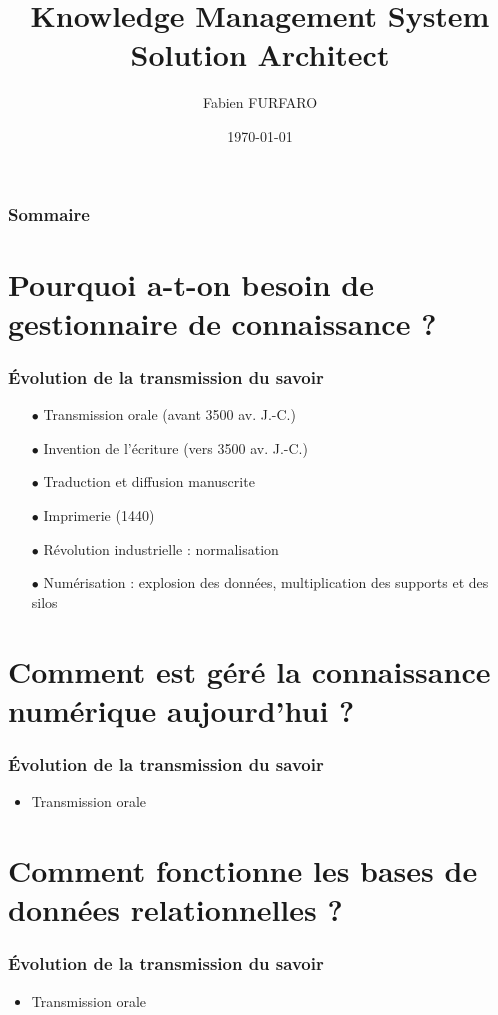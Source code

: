 \documentclass{beamer}
\title{Knowledge Management System\\Solution Architect}
\author{Fabien FURFARO}
\date{\today}
\begin{document}
\frame{\titlepage}

\begin{frame}
  \frametitle{Sommaire}
  \tableofcontents
\end{frame}

\section{Pourquoi a-t-on besoin de gestionnaire de connaissance ?}

\begin{frame}
  \frametitle{Évolution de la transmission du savoir}

  \begin{itemize}
    \item[$\bullet$] Transmission orale (avant 3500 av. J.-C.)
    \item[$\bullet$] Invention de l’écriture (vers 3500 av. J.-C.)
    \item[$\bullet$] Traduction et diffusion manuscrite
    \item[$\bullet$] Imprimerie (1440)
    \item[$\bullet$] Révolution industrielle : normalisation
    \item[$\bullet$] Numérisation : explosion des données, multiplication des supports et des silos
  \end{itemize}

\end{frame}


\section{Comment est géré la connaissance numérique aujourd'hui ?}

\begin{frame}
  \frametitle{Évolution de la transmission du savoir}
  \begin{itemize}
    \item Transmission orale
  \end{itemize}
\end{frame}


\section{Comment fonctionne les bases de données relationnelles ?}

\begin{frame}
  \frametitle{Évolution de la transmission du savoir}
  \begin{itemize}
    \item Transmission orale
  \end{itemize}
\end{frame}
\end{document}
